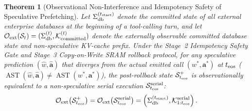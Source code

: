 \documentclass[10pt,conference]{IEEEtran}
\newtheorem{theorem}{Theorem}
\begin{document}
\begin{theorem}[Observational Non-Interference and Idempotency Safety of Speculative Prefetching]
\label{thm:noninterference}
Let $\Sigma_{\textnormal{db}}^{(t_{\textnormal{start}})}$ denote the committed state of all external enterprise databases at the beginning of a tool-calling turn, and let $\mathcal{O}_{\textnormal{ext}}(\mathcal{S}_t) = (\Sigma_{\textnormal{db}}^{(t)}, \mathcal{K}_{\textnormal{committed}}^{(t)})$ denote the externally observable committed database state and non-speculative KV-cache prefix. Under the Stage~2 Idempotency Safety Gate and Stage~3 Copy-on-Write SRAM rollback protocol, for any speculative prediction $(\hat{w}, \hat{\mathbf{a}})$ that diverges from the actual emitted call $(w^*, \mathbf{a}^*)$ at $t_{\textnormal{eos}}$ ($\operatorname{AST}(\hat{w}, \hat{\mathbf{a}}) \neq \operatorname{AST}(w^*, \mathbf{a}^*)$), the post-rollback state $\mathcal{S}_{t_{\textnormal{eos}}}^+$ is observationally equivalent to a non-speculative serial execution $\mathcal{S}_{t_{\textnormal{eos}}}^{\textnormal{serial}}$:
\begin{equation}
\mathcal{O}_{\textnormal{ext}}\!\left(\mathcal{S}_{t_{\textnormal{eos}}}^+\right) = \mathcal{O}_{\textnormal{ext}}\!\left(\mathcal{S}_{t_{\textnormal{eos}}}^{\textnormal{serial}}\right) = \left(\Sigma_{\textnormal{db}}^{(t_{\textnormal{start}})}, \mathcal{K}_{1:t_{\textnormal{eos}}}^{\textnormal{serial}}\right).
\label{eq:noninterference}
\end{equation}
\end{theorem}
\end{document}
